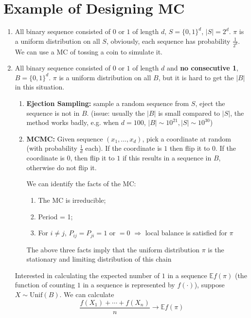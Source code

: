 \documentclass[11pt]{elegantbook}
\begin{document}
\section{Example of Designing MC}
\begin{enumerate}
    \item All binary sequence consisted of $0$ or $1$ of length $d$, $S=\{0,1\}^d$, $|S|=2^d$. $\pi$ is a uniform distribution on all $S$, obviously, each sequence has probability $\frac{1}{2^d}$. We can use a MC of tossing a coin to simulate it.
    \item All binary sequence consisted of $0$ or $1$ of length $d$ and \textbf{no consecutive 1}, $B=\{0,1\}^d$. $\pi$ is a uniform distribution on all $B$, but it is hard to get the $|B|$ in this situation.
    \begin{enumerate}[-]
        \item \textbf{Ejection Sampling:} sample a random sequence from $S$, eject the sequence is not in $B$.
        (issue: usually the $|B|$ is small compared to $|S|$, the method works badly, e.g. when $d=100$, $|B|\sim 10^{21}, |S|\sim 10^{30}$)
        \item \textbf{MCMC:} Given sequence $(x_1,...,x_d)$, pick a coordinate at random (with probability $\frac{1}{d}$ each). If the coordinate is $1$ then flip it to $0$. If the coordinate is $0$, then flip it to $1$ if this results in a sequence in $B$, otherwise do not flip it.
        
        We can identify the facts of the MC:
        \begin{enumerate}[(1)]
            \item The MC is irreducible;
            \item Period = 1;
            \item For $i\neq j$, $P_{ij}=P_{ji}=1$ or $=0$ $\Rightarrow$ local balance is satisfied for $\pi$
        \end{enumerate}
        The above three facts imply that the uniform distribution $\pi$ is the stationary and limiting distribution of this chain
    \end{enumerate}
    Interested in calculating the expected number of $1$ in a sequence $\mathbb{E} f(\pi)$ (the function of counting $1$ in a sequence is represented by $f(\cdot)$), suppose $X\sim \text{Unif}(B)$. We can calculate $$\frac{f(X_1)+\cdots+f(X_n)}{n} \rightarrow \mathbb{E}f(\pi)$$
\end{enumerate}
\end{document}
